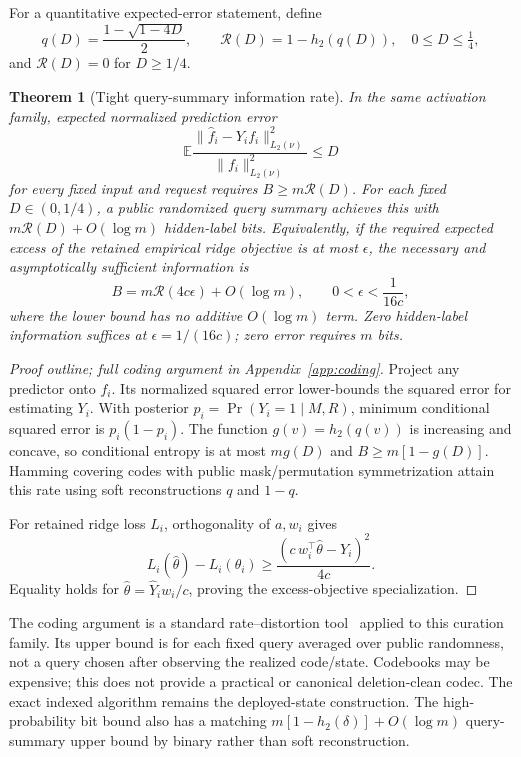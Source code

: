 \documentclass[11pt,a4paper]{article}
\newtheorem{theorem}{Theorem}[section]
\theoremstyle{definition}\newtheorem{definition}[theorem]{Definition}
\begin{document}
For a quantitative expected-error statement, define
\[
 q(D)=\frac{1-\sqrt{1-4D}}2,\qquad
 \mathcal R(D)=1-h_2(q(D)),\quad 0\le D\le\tfrac14,
\]
and $\mathcal R(D)=0$ for $D\ge1/4$.
\begin{theorem}[Tight query-summary information rate]\label{thm:distortion}
In the same activation family, expected normalized prediction error
\[
 \mathbb E\frac{\|\widehat f_i-Y_if_i\|_{L_2(\nu)}^2}{\|f_i\|_{L_2(\nu)}^2}\le D
\]
for every fixed input and request requires $B\ge m\mathcal R(D)$. For each fixed $D\in(0,1/4)$, a public randomized query summary achieves this with $m\mathcal R(D)+O(\log m)$ hidden-label bits. Equivalently, if the required expected excess of the retained empirical ridge objective is at most $\epsilon$, the necessary and asymptotically sufficient information is
\[
 B=m\mathcal R(4c\epsilon)+O(\log m),
 \qquad 0<\epsilon<\frac1{16c},
\]
where the lower bound has no additive $O(\log m)$ term. Zero hidden-label information suffices at $\epsilon=1/(16c)$; zero error requires $m$ bits.
\end{theorem}
\begin{proof}[Proof outline; full coding argument in Appendix~\ref{app:coding}]
Project any predictor onto $f_i$. Its normalized squared error lower-bounds the squared error for estimating $Y_i$. With posterior $p_i=\Pr(Y_i=1\mid M,R)$, minimum conditional squared error is $p_i(1-p_i)$. The function $g(v)=h_2(q(v))$ is increasing and concave, so conditional entropy is at most $mg(D)$ and $B\ge m[1-g(D)]$. Hamming covering codes with public mask/permutation symmetrization attain this rate using soft reconstructions $q$ and $1-q$.

For retained ridge loss $L_i$, orthogonality of $a,w_i$ gives
\[
 L_i(\widehat\theta)-L_i(\theta_i)
 \ge\frac{(c\,w_i^\top\widehat\theta-Y_i)^2}{4c}.
\]
Equality holds for $\widehat\theta=\widehat Y_iw_i/c$, proving the excess-objective specialization.
\end{proof}
The coding argument is a standard rate--distortion tool~\cite{shannon1959} applied to this curation family. Its upper bound is for each fixed query averaged over public randomness, not a query chosen after observing the realized code/state. Codebooks may be expensive; this does not provide a practical or canonical deletion-clean codec. The exact indexed algorithm remains the deployed-state construction. The high-probability bit bound also has a matching $m[1-h_2(\delta)]+O(\log m)$ query-summary upper bound by binary rather than soft reconstruction.
\end{document}

